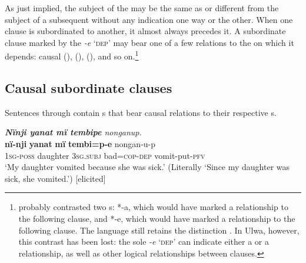   As just implied, the subject of the  may be the same as or different from the subject of a subsequent  without any  indication one way or the other. When one clause is subordinated to another, it almost always precedes it. A subordinate clause marked by the  \textit{-e} ‘\textsc{dep}’ may bear one of a few  relations to the  on which it depends: causal (),  (),  (), and so on.\footnote{ probably contrasted two s: *-a, which would have marked a  relationship to the following clause, and *\nobreakdash-e, which would have marked a  relationship to the following clause. The  language  still retains the distinction \citep[74]{Barlow2021}. In Ulwa, however, this contrast has been lost: the sole  \textit{-e} ‘\textsc{dep}’ can indicate either a  or a   relationship, as well as other logical relationships between clauses.}


\subsection{Causal subordinate clauses}\label{sec:12.2.2}


Sentences  through  contain s that bear causal relations to their respective s.

\ea%
    \label{ex:complex:43}
          \textit{\textbf{Nïnji yanat mï tembipe} nonganup.}\\
\gll    \textbf{nï-nji}    \textbf{yanat}    \textbf{mï}      \textbf{tembi=p-e}    nongan-u-p\\
    1\textsc{sg-poss}  daughter  3\textsc{sg.subj}  bad=\textsc{cop{}-dep} vomit-put-\textsc{pfv}\\
\glt `My daughter vomited because she was sick.’ (Literally ‘Since my daughter was sick, she vomited.’) [elicited]
\z

